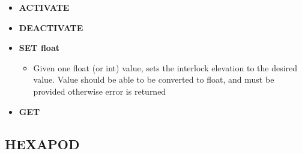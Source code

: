 \documentclass[12pt]{report}
\begin{document}
	\begin{itemize}
	
		\item[] {\bf{ACTIVATE}}
			
		\item[] {\bf{DEACTIVATE}}
			
		\item[] {\bf{SET float}}
			\begin{itemize}
				\item[] {Given one float (or int) value, sets the interlock elevation to the desired value. Value should be able to be converted 
				to float, and must be provided otherwise error is returned}
			\end{itemize}			
		\item[] {\bf{GET}}
			
	\end{itemize}
	
\newpage
\hspace{-22px} 
\subsection*{HEXAPOD}
\end{document}
